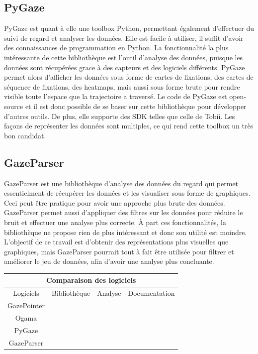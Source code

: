 \documentclass[12pt]{article}
\newcommand{\cmark}{\ding{51}}
\newcommand{\xmark}{\ding{55}}
\begin{document}
\subsection{PyGaze}

PyGaze \cite{pygaze} est quant à elle une toolbox Python, permettant également
d'effectuer du suivi de regard et analyser les données. Elle est facile à
utiliser, il suffit d'avoir des connaissances de programmation en Python.
La fonctionnalité la plus intéressante de cette bibliothèque est l'outil
d'analyse des données, puisque les données sont récupérées grace à des capteurs
et des logiciels différents. PyGaze permet alors d'afficher les données sous
forme de cartes de fixations, des cartes de séquence de fixations, des heatmaps,
mais aussi sous forme brute pour rendre visible toute l'espace que la
trajectoire a traversé. Le code de PyGaze est open-source et il est donc
possible de se baser sur cette bibliothèque pour développer d'autres outils. De
plus, elle supporte des SDK telles que celle de Tobii. Les façons de
représenter les données sont multiples, ce qui rend cette toolbox un très bon
candidat.

\subsection{GazeParser}

GazeParser \cite{gazeparser} est une bibliothèque d'analyse des données du
regard qui permet essentielment de récupérer les données et les visualiser sous
forme de graphiques. Ceci peut être pratique pour avoir une approche plus brute
des données. GazeParser permet aussi d'appliquer des filtres sur les données
pour réduire le bruit et effectuer une analyse plus correcte. À part ces
fonctionnalités, la bibliothèque ne propose rien de plus intéressant et donc son
utilité est moindre. L'objectif de ce travail est d'obtenir des représentations
plus visuelles que graphiques, mais GazeParser pourrait tout à fait être
utilisée pour filtrer et améliorer le jeu de données, afin d'avoir une analyse
plus concluante.

\begin{center}
  \begin{tabular}{ |c||c|c|c|  }
    \hline
    \multicolumn{4}{|c|}{Comparaison des logiciels}                            \\
    \hline
    Logiciels   & Bibliothèque & Analyse               & Documentation         \\
    \hline
    GazePointer & \xmark       & \cmark                & \cmark                \\
    Ogama       & \xmark       & \cmark \cmark  \cmark & \cmark \cmark         \\
    PyGaze      & \cmark       & \cmark \cmark  \cmark & \cmark \cmark  \cmark \\
    GazeParser  & \cmark       & \cmark                & \cmark \cmark         \\
    \hline
  \end{tabular}
\end{center}
\end{document}
